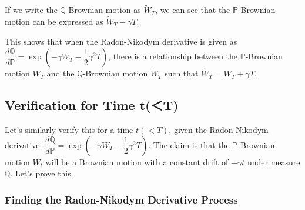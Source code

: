 \documentclass[uplatex,a4j,12pt,dvipdfmx]{jsarticle}
\begin{document}
If we write the $\mathbb{Q}$-Brownian motion as $\tilde{W}_{T}$, we can see that the $\mathbb{P}$-Brownian motion can be expressed as $\tilde{W}_{T} - \gamma T$.

This shows that when the Radon-Nikodym derivative is given as
$
	\dfrac{ d \mathbb{Q} }{ d \mathbb{P} }
	=
	\exp \left( - \gamma W_{T} - \dfrac{1}{2} \gamma^{2} T \right)
$,
there is a relationship between the $\mathbb{P}$-Brownian motion $W_{T}$ and the $\mathbb{Q}$-Brownian motion $\tilde{W}_{T}$ such that $\tilde{W}_{T} = W_{T} + \gamma T$.

\subsection{Verification for Time t(＜T)}

Let's similarly verify this for a time $t(<T)$, given the Radon-Nikodym derivative:
$
	\dfrac{ d \mathbb{Q} }{ d \mathbb{P} }
	=
	\exp \left( - \gamma W_{T} - \dfrac{1}{2} \gamma^{2} T \right)
$.
The claim is that the $\mathbb{P}$-Brownian motion $W_{t}$ will be a Brownian motion with a constant drift of $-\gamma t$ under measure $\mathbb{Q}$. Let's prove this.
${}$

\subsubsection{Finding the Radon-Nikodym Derivative Process}
\end{document}
